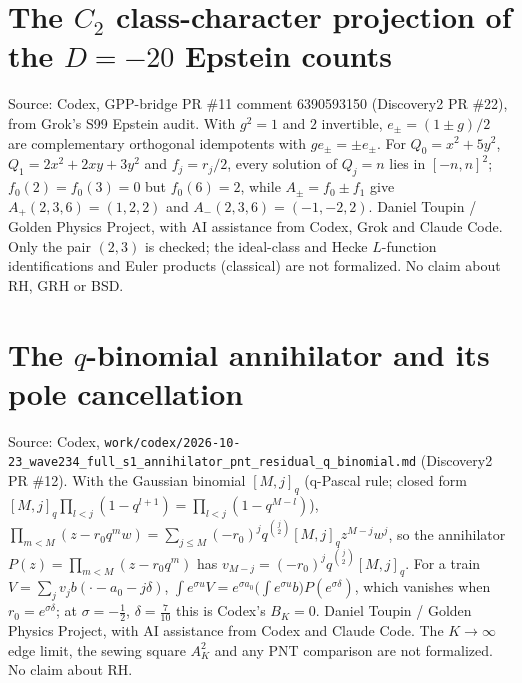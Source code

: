 \documentclass{report}
\theoremstyle{definition}
\begin{document}
\begin{itemize}
\begin{itemize}
\section{The \texorpdfstring{$C_2$}{C2} class-character projection of the \texorpdfstring{$D=-20$}{D=-20} Epstein counts}
Source: Codex, GPP-bridge PR \#11 comment 6390593150 (Discovery2 PR \#22), from Grok's S99 Epstein audit. With $g^2=1$ and $2$ invertible, $e_\pm=(1\pm g)/2$ are complementary
orthogonal idempotents with $ge_\pm=\pm e_\pm$. For $Q_0=x^2+5y^2$, $Q_1=2x^2+2xy+3y^2$ and $f_j=r_j/2$, every solution of $Q_j=n$ lies in $[-n,n]^2$; $f_0(2)=f_0(3)=0$ but
$f_0(6)=2$, while $A_\pm=f_0\pm f_1$ give $A_+(2,3,6)=(1,2,2)$ and $A_-(2,3,6)=(-1,-2,2)$. Daniel Toupin / Golden Physics Project, with AI assistance from Codex, Grok and
Claude Code. Only the pair $(2,3)$ is checked; the ideal-class and Hecke $L$-function identifications and Euler products (classical) are not formalized. No claim about RH,
GRH or BSD.

\section{The \texorpdfstring{$q$}{q}-binomial annihilator and its pole cancellation}
Source: Codex, \texttt{work/codex/2026-10-23\_wave234\_full\_s1\_annihilator\_pnt\_residual\_q\_binomial.md} (Discovery2 PR \#12). With the Gaussian binomial $[M,j]_q$ (q-Pascal rule;
closed form $[M,j]_q\prod_{l<j}(1-q^{l+1})=\prod_{l<j}(1-q^{M-l})$), $\prod_{m<M}(z-r_0q^mw)=\sum_{j\le M}(-r_0)^jq^{\binom j2}[M,j]_qz^{M-j}w^j$, so the annihilator
$P(z)=\prod_{m<M}(z-r_0q^m)$ has $v_{M-j}=(-r_0)^jq^{\binom j2}[M,j]_q$. For a train $V=\sum_jv_jb(\cdot-a_0-j\delta)$,
$\int e^{\sigma u}V=e^{\sigma a_0}\bigl(\int e^{\sigma u}b\bigr)P(e^{\sigma\delta})$, which vanishes when $r_0=e^{\sigma\delta}$; at $\sigma=-\tfrac12$, $\delta=\tfrac7{10}$ this is Codex's $B_K=0$.
Daniel Toupin / Golden Physics Project, with AI assistance from Codex and Claude Code. The $K\to\infty$ edge limit, the sewing square $A_K^2$ and any PNT comparison are not
formalized. No claim about RH.


\end{itemize}
\end{itemize}
\end{document}
